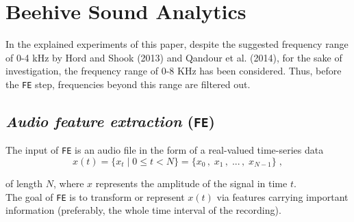 \documentclass[12pt]{report}
\begin{document}
	\section{Beehive Sound Analytics}
	
	In the explained experiments of this paper, despite the suggested frequency range of 0-4 kHz by Hord and Shook (2013) and Qandour et al. (2014), for	the sake of investigation, the frequency range of 0-8 KHz has been	considered. Thus, before the {\tt FE} step, frequencies beyond this range are filtered out.
	
	\subsection{\textit{Audio feature extraction} ({\tt FE})}
	
	The input of {\tt FE} is an audio file in the form of a real-valued time-series data
	\begin{equation*}
		x(t) = \{ x_t \; | \; 0 \le t < N \} = \{ x_0 \, , \; x_1 \, , \; ... \, , \; x_{N - 1} \} \; ,
	\end{equation*}
	
	of length $N$, where $x$ represents the amplitude of the signal in time $t$.\\
	
	The goal of {\tt FE} is to transform or represent $x(t)$ via features carrying important information (preferably, the whole time interval of the recording).
	
\end{document}
